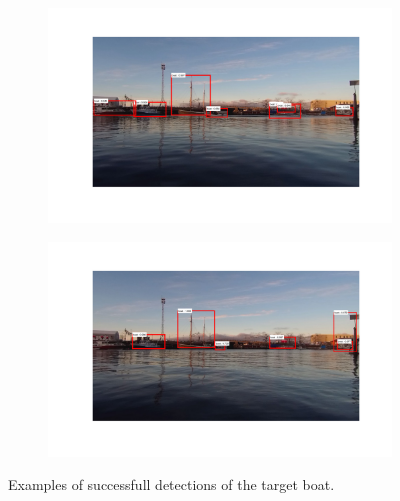 \begin{figure}
	\begin{subfigure}[t]{.5\textwidth}
	\centering
	\includegraphics[width=\linewidth]{fig/discussion/ex5_1.png}
	\end{subfigure}%
	\begin{subfigure}[t]{.5\textwidth}
	\centering
	\includegraphics[width=\linewidth]{fig/discussion/ex6_1.png}
	\end{subfigure}
	\caption{Examples of successfull detections of the target boat.}
	\label{some example}
\end{figure}
\cleardoublepage